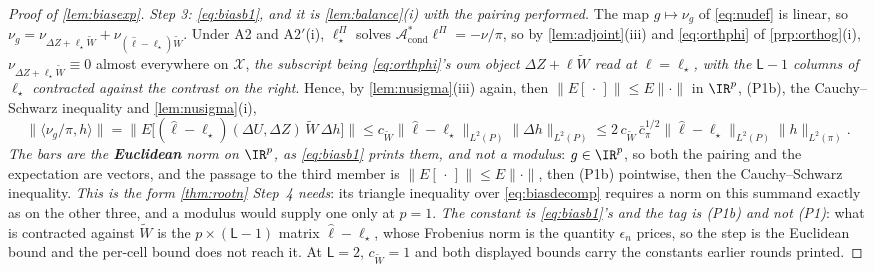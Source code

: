 \begin{proof}[Proof of \cref{lem:biasexp}]
\emph{Step 3: \eqref{eq:biasb1}, and it is \cref{lem:balance}\textup{(i)} with the pairing performed.} The
map $g\mapsto\nu_g$ of \eqref{eq:nudef} is linear, so
$\nu_g=\nu_{\Delta Z+\ell_\star\widetilde W}+\nu_{(\hat\ell-\ell_\star)\widetilde W}$. Under A2 and
A$2'$(i), $\ell^\Pi_\star$ solves $\mathcal A^\ast_{\mathrm{cond}}\ell^\Pi=-\nu/\pi$, so by
\cref{lem:adjoint}(iii) and \eqref{eq:orthphi} of \cref{prp:orthog}(i),
$\nu_{\Delta Z+\ell_\star\widetilde W}\equiv0$ almost everywhere on $\mathcal X$, \emph{the subscript
being \eqref{eq:orthphi}'s own object $\Delta Z+\ell\widetilde W$ read at $\ell=\ell_\star$, with the
$\mathsf L-1$ columns of $\ell_\star$ contracted against the contrast on the right}. Hence, by
\cref{lem:nusigma}(iii) again, then $\|E[\,\cdot\,]\|\le E\|\cdot\|$ in $\IR^{p}$, \textup{(P1b)}, the
Cauchy--Schwarz inequality and
\cref{lem:nusigma}(i),
\[
\big\|\big\langle\nu_g/\pi,h\big\rangle\big\|
=\big\|E\big[(\hat\ell-\ell_\star)(\Delta U,\Delta Z)\,\widetilde W\,\Delta h\big]\big\|
\le c_{\widetilde W}\big\|\hat\ell-\ell_\star\big\|_{L^{2}(P)}\big\|\Delta h\big\|_{L^{2}(P)}
\le2\,c_{\widetilde W}\,\bar c_\pi^{1/2}\big\|\hat\ell-\ell_\star\big\|_{L^{2}(P)}\big\|h\big\|_{L^{2}(\pi)} .
\]
\emph{The bars are the \textbf{Euclidean} norm on $\IR^{p}$, as \eqref{eq:biasb1} prints them, and not a
modulus}: $g\in\IR^{p}$, so both the pairing and the expectation are vectors, and the passage to the third
member is $\|E[\,\cdot\,]\|\le E\|\cdot\|$, then \textup{(P1b)} pointwise, then the Cauchy--Schwarz
inequality. \emph{This is the form \cref{thm:rootn} Step~4 needs}: its triangle inequality over
\eqref{eq:biasdecomp} requires a norm on this summand exactly as on the other three, and a modulus would
supply one only at $p=1$.
\emph{The constant is \eqref{eq:biasb1}'s and the tag is \textup{(P1b)} and not \textup{(P1)}}: what is
contracted against $\widetilde W$ is the $p\times(\mathsf L-1)$ matrix $\hat\ell-\ell_\star$, whose
Frobenius norm is the quantity $\epsilon_n$ prices, so the step is the Euclidean bound and the per-cell
bound does not reach it. At $\mathsf L=2$, $c_{\widetilde W}=1$ and both displayed bounds carry the
constants earlier rounds printed.


\end{proof}
